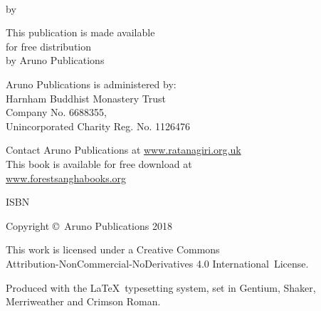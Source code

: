 \cleartoverso
\thispagestyle{empty}

{\copyrightsize
\centering
\setlength{\parindent}{0pt}%
\setlength{\parskip}{0.8\baselineskip}%

\thetitle\\
by \theauthor

This publication is made available\\
for free distribution\\
by Aruno Publications

Aruno Publications is administered by:\\
Harnham Buddhist Monastery Trust\\
Company No. 6688355,\\
Unincorporated Charity Reg. No. 1126476

Contact Aruno Publications at \href{http://ratanagiri.org.uk/}{www.ratanagiri.org.uk}\\
This book is available for free download at\\
\href{http://forestsanghabooks.org/}{www.forestsanghabooks.org}

ISBN \theISBN

Copyright \copyright\ Aruno Publications 2018

\vfill

{\footnotesize

This work is licensed under a Creative Commons\\
Attribution-NonCommercial-NoDerivatives 4.0 International~License.

Produced with the \LaTeX\ typesetting system, set in Gentium, Shaker,\\
Merriweather and Crimson Roman.

\theEditionInfo

}}
